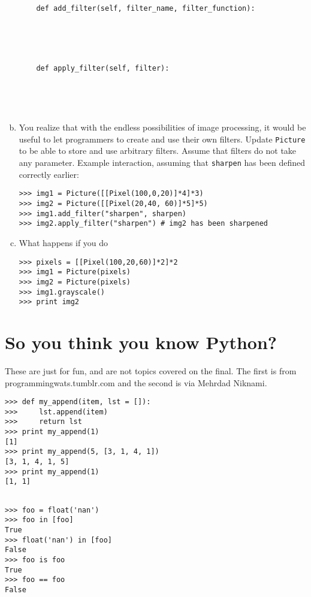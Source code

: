 \documentclass[11pt]{article}
\begin{document}
\begin{enumerate}[a)]
\begin{verbatim}
    def add_filter(self, filter_name, filter_function):




        
    def apply_filter(self, filter):
    
    
    
    
\end{verbatim}

\item You realize that with the endless possibilities of image processing, it would be useful to let programmers to create and use their own filters. Update \texttt{Picture} to be able to store and use arbitrary filters. Assume that filters do not take any parameter. Example interaction, assuming that \texttt{sharpen} has been defined correctly earlier:
\begin{verbatim}
>>> img1 = Picture([[Pixel(100,0,20)]*4]*3) 
>>> img2 = Picture([[Pixel(20,40, 60)]*5]*5) 
>>> img1.add_filter("sharpen", sharpen)
>>> img2.apply_filter("sharpen") # img2 has been sharpened
\end{verbatim}

\item What happens if you do
\begin{verbatim}
>>> pixels = [[Pixel(100,20,60)]*2]*2
>>> img1 = Picture(pixels)
>>> img2 = Picture(pixels)
>>> img1.grayscale()
>>> print img2

\end{verbatim}

\end{enumerate}

\section{So you think you know Python?}
\textnormal{These are just for fun, and are not topics covered on the final. The first is from programmingwats.tumblr.com and the second is via Mehrdad Niknami.}

\begin{verbatim}
>>> def my_append(item, lst = []):
>>>     lst.append(item)
>>>     return lst
>>> print my_append(1)
[1]
>>> print my_append(5, [3, 1, 4, 1])
[3, 1, 4, 1, 5]
>>> print my_append(1)
[1, 1]
\end{verbatim}


\begin{verbatim}

>>> foo = float('nan')
>>> foo in [foo]
True
>>> float('nan') in [foo]
False
>>> foo is foo
True
>>> foo == foo
False
\end{verbatim}
\end{document}
